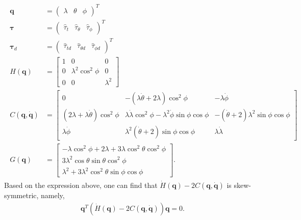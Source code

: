 \documentclass[3p]{elsarticle}
\theoremstyle{plain}
\theoremstyle{remark}
\begin{document}
\begin{align}
\begin{split}
\bm q&= \begin{pmatrix}\lambda&\theta&\phi\end{pmatrix}^T\\
\bm \tau&=\begin{pmatrix}\hat\tau_t&\hat\tau_\theta&\hat\tau_\phi\end{pmatrix}^T\\
\bm\tau_d&=\begin{pmatrix}\hat\tau_{td}&\hat\tau_{\theta d}&\hat\tau_{\phi d}\end{pmatrix}^T\\
H(\bm q) &= \begin{bmatrix}1 &0&0\\0 &\lambda^2\cos^2\phi&0\\0&0&\lambda^2\end{bmatrix}\\
C(\bm q,\dot{\bm q}) &=\begin{bmatrix}0 &-(\lambda\dot \theta+2\lambda)\cos^2\phi&-\lambda\dot\phi\\(2\lambda+\lambda\dot \theta)\cos^2\phi&\lambda\dot \lambda\cos^2\phi-\lambda^2\dot\phi\sin\phi\cos\phi&-(\dot\theta+2)\lambda^2\sin\phi\cos\phi\\ \lambda\dot\phi&\lambda^2(\dot\theta+2)\sin\phi\cos\phi&\lambda\dot \lambda\end{bmatrix}\\
G(\bm q) &=\begin{bmatrix}-\lambda\cos^2\phi+2\lambda+3\lambda\cos ^2\theta\cos^2\phi\\3\lambda^2\cos\theta\sin\theta\cos^2\phi\\\lambda^2+3\lambda^2\cos^2\theta\sin\phi\cos\phi\end{bmatrix}.
\end{split}
\end{align}
Based on the expression above, one can find that $\dot H(\bm q) - 2C(\bm q,\dot{\bm q})$ is skew-symmetric, namely,
\begin{align}
\bm q^T(\dot H(\bm q) - 2C(\bm q,\dot{\bm q}))\bm q = 0.
\end{align}
\end{document}
